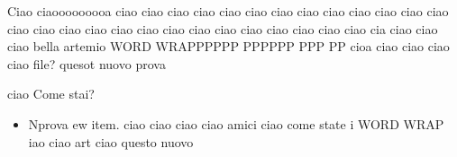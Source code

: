 Ciao ciaooooooooa ciao ciao ciao ciao ciao ciao ciao ciao ciao ciao ciao ciao
ciao ciao ciao ciao ciao ciao ciao ciao ciao ciao ciao ciao ciao ciao ciao cia
ciao
ciao ciao bella artemio  WORD WRAPPPPPP PPPPPP PPP PP cioa ciao ciao ciao ciao
file?  quesot nuovo prova 

ciao Come stai?

\begin{itemize} \item Nprova ew item. ciao ciao ciao ciao amici ciao come state
	i WORD WRAP iao ciao art ciao questo nuovo \end{itemize}

